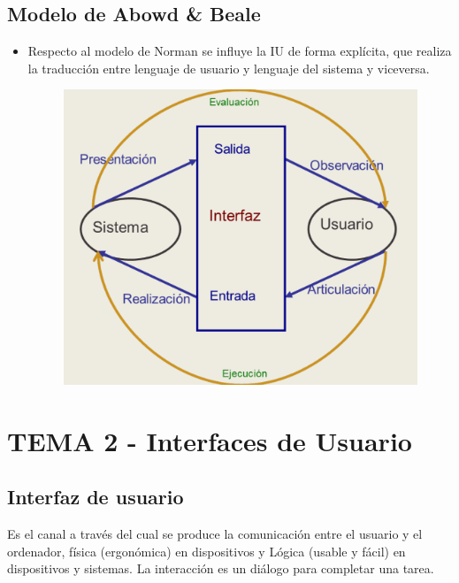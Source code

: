 \documentclass[12pt, twoside, openright]{report} %
\begin{document}
\section{Modelo de Abowd \& Beale}

  \begin{itemize}
  
  \item
    Respecto al modelo de Norman se influye la IU de forma explícita,
    que realiza la traducción entre lenguaje de usuario y lenguaje del
    sistema y viceversa.
	\begin{figure}[H]
		{\includegraphics[scale=.3]{Untitled 2.png}}
	\end{figure}
  \end{itemize}

\chapter{TEMA 2 - Interfaces de Usuario}

\section{Interfaz de usuario}

    Es el canal a través del cual se produce la comunicación entre el
    usuario y el ordenador, física (ergonómica) en dispositivos y Lógica
    (usable y fácil) en dispositivos y sistemas. La interacción es un
    diálogo para completar una tarea.
\end{document}
